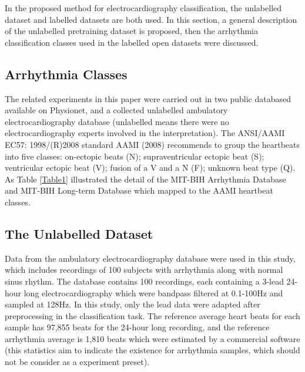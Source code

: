 \documentclass[journal]{IEEEtran}
\begin{document}
In the proposed method for electrocardiography classification, the unlabelled dataset and labelled datasets are both used. In this section, a general description of the unlabelled pretraining dataset is proposed, then the arrhythmia classification classes used in the labelled open datasets were discussed.



\subsection{Arrhythmia Classes}
The related experiments in this paper were carried out in two public databased available on Physionet, and a collected unlabelled ambulatory electrocardiography database (unlabelled means there were no electrocardiography experts involved in the interpretation). 
The ANSI/AAMI EC57: 1998/(R)2008 standard AAMI (2008) recommends to group the heartbeats into five classes: on-ectopic beats (N); supraventricular ectopic beat (S); ventricular ectopic beat (V); fusion of a V and a N (F); unknown beat type (Q).
As Table \ref{Table1} illustrated the detail of the MIT-BIH Arrhythmia Database and MIT-BIH Long-term Database which mapped to the AAMI heartbeat classes.


\subsection{The Unlabelled Dataset}
Data from the ambulatory electrocardiography database were used in this study, which includes recordings of 100 subjects with arrhythmia along with normal sinus rhythm. The database contains 100 recordings, each containing a 3-lead 24-hour long electrocardiography which were bandpass filtered at 0.1-100Hz and sampled at 128Hz. In this study, only the lead \uppercase\expandafter{} data were adapted after preprocessing in the classification task. The reference average heart beats for each sample has 97,855 beats for the 24-hour long recording, and the reference arrhythmia average is 1,810 beats which were estimated by a commercial software (this statistics aim to indicate the existence for arrhythmia samples, which should not be consider as a experiment preset).
\end{document}
